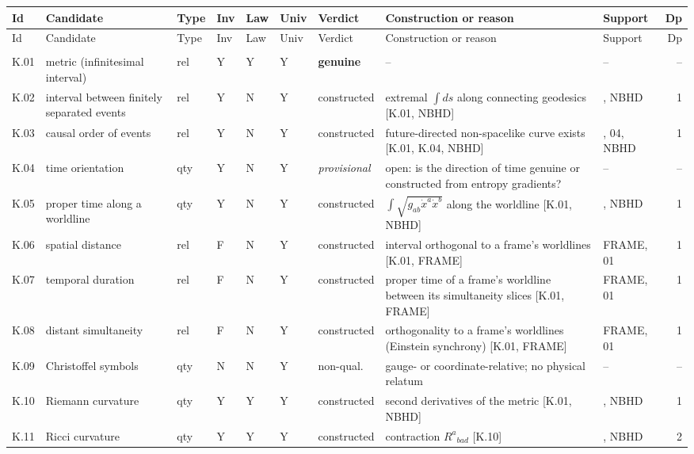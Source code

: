 {\scriptsize\setlength{\tabcolsep}{2.5pt}
\begin{longtable}{@{}>{\raggedright\arraybackslash}p{0.75cm}>{\raggedright\arraybackslash}p{2.9cm}llll>{\raggedright\arraybackslash}p{1.45cm}>{\raggedright\arraybackslash}p{4.6cm}>{\raggedright\arraybackslash}p{1.9cm}r@{}}
\toprule
Id & Candidate & Type & Inv & Law & Univ & Verdict & Construction or reason & Support & Dp \\
\midrule\endfirsthead
\toprule
Id & Candidate & Type & Inv & Law & Univ & Verdict & Construction or reason & Support & Dp \\
\midrule\endhead
\midrule\multicolumn{10}{r}{\emph{continued}}\\\endfoot
\bottomrule\endlastfoot
K.01 & metric (infinitesimal interval) & rel & Y & Y & Y & \textbf{genuine} & -- & -- & -- \\
K.02 & interval between finitely separated events & rel & Y & N & Y & constructed & extremal $\int ds$ along connecting geodesics [K.01, NBHD] & 01, NBHD & 1 \\
K.03 & causal order of events & rel & Y & N & Y & constructed & future-directed non-spacelike curve exists [K.01, K.04, NBHD] & 01, 04, NBHD & 1 \\
K.04 & time orientation & qty & Y & N & Y & \emph{provisional} & open: is the direction of time genuine or constructed from entropy gradients? & -- & -- \\
K.05 & proper time along a worldline & qty & Y & N & Y & constructed & $\int\sqrt{g_{ab}\dot x^a\dot x^b}$ along the worldline [K.01, NBHD] & 01, NBHD & 1 \\
K.06 & spatial distance & rel & F & N & Y & constructed & interval orthogonal to a frame's worldlines [K.01, FRAME] & FRAME, 01 & 1 \\
K.07 & temporal duration & rel & F & N & Y & constructed & proper time of a frame's worldline between its simultaneity slices [K.01, FRAME] & FRAME, 01 & 1 \\
K.08 & distant simultaneity & rel & F & N & Y & constructed & orthogonality to a frame's worldlines (Einstein synchrony) [K.01, FRAME] & FRAME, 01 & 1 \\
K.09 & Christoffel symbols & qty & N & N & Y & non-qual. & gauge- or coordinate-relative; no physical relatum & -- & -- \\
K.10 & Riemann curvature & qty & Y & Y & Y & constructed & second derivatives of the metric [K.01, NBHD] & 01, NBHD & 1 \\
K.11 & Ricci curvature & qty & Y & Y & Y & constructed & contraction $R^a{}_{bad}$ [K.10] & 01, NBHD & 2 \\

\end{longtable}}
